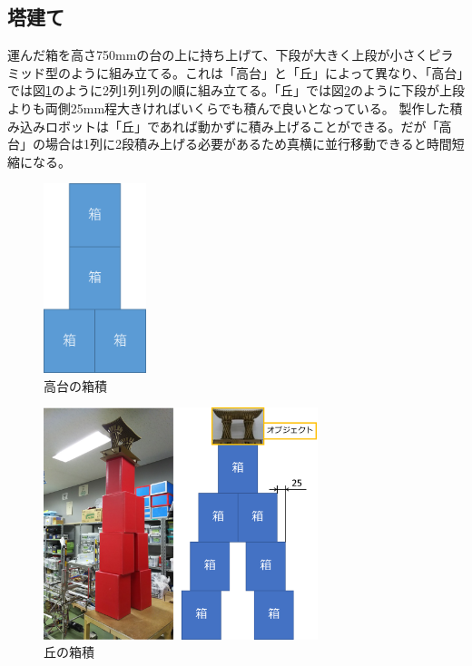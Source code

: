 \documentclass[12pt,oneside]{sotsuken_paper}
\begin{document}
		\subsection{塔建て}
		運んだ箱を高さ750mmの台の上に持ち上げて、下段が大きく上段が小さくピラミッド型のように組み立てる。これは「高台」と「丘」によって異なり、「高台」では図\ref{高台の箱積}のように2列1列1列の順に組み立てる。「丘」では図\ref{丘の箱積}のように下段が上段よりも両側25mm程大きければいくらでも積んで良いとなっている。
		製作した積み込みロボットは「丘」であれば動かずに積み上げることができる。だが「高台」の場合は1列に2段積み上げる必要があるため真横に並行移動できると時間短縮になる。

		\begin{figure}[htp]
			\begin{center}
				\includegraphics[width=30mm]{Image/高台箱積.png}
				\caption{高台の箱積}
				\label{高台の箱積}
			\end{center}
		\end{figure}

		\begin{figure}[htp]
			\begin{center}
				\includegraphics[width=80mm]{Image/丘の箱積.png}
				\caption{丘の箱積}
				\label{丘の箱積}
			\end{center}
		\end{figure}
\end{document}
